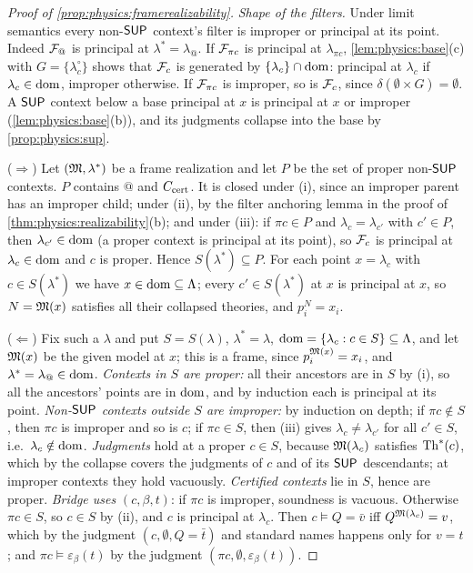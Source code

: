\begin{proof}[Proof of \cref{prop:physics:framerealizability}]
\emph{Shape of the filters.} Under limit semantics every non-$\mathsf{SUP}$ context's filter is
improper or principal at its point. Indeed $\mathcal{F}_@$ is principal at $\lambda^*=\lambda_@$. If
$\mathcal{F}_{\pi c}$ is principal at $\lambda_{\pi c}$, \cref{lem:physics:base}(c) with $G=\{\lambda^\circ_c\}$
shows that $\mathcal{F}_c$ is generated by $\{\lambda_c\}\cap\operatorname{dom}$: principal at $\lambda_c$ if
$\lambda_c\in\operatorname{dom}$, improper otherwise. If $\mathcal{F}_{\pi c}$ is improper, so is $\mathcal{F}_c$, since
$\delta(\emptyset\times G)=\emptyset$. A $\mathsf{SUP}$ context below a base principal at $x$ is
principal at $x$ or improper (\cref{lem:physics:base}(b)), and its judgments collapse into
the base by \cref{prop:physics:sup}.

($\Rightarrow$) Let $(\mathfrak{M},\lambda^*)$ be a frame realization and let $P$ be the set of
proper non-$\mathsf{SUP}$ contexts. $P$ contains $@$ and $C_{\mathrm{cert}}$. It is closed under (i), since an
improper parent has an improper child; under (ii), by the filter anchoring lemma in the
proof of \cref{thm:physics:realizability}(b); and under (iii): if $\pi c\in P$ and
$\lambda_c=\lambda_{c'}$ with $c'\in P$, then $\lambda_{c'}\in\operatorname{dom}$ (a proper context is
principal at its point), so $\mathcal{F}_c$ is principal at $\lambda_c\in\operatorname{dom}$ and $c$ is proper.
Hence $S(\lambda^*)\subseteq P$. For each point $x=\lambda_c$ with $c\in S(\lambda^*)$ we have
$x\in\operatorname{dom}\subseteq\Lambda$; every $c'\in S(\lambda^*)$ at $x$ is principal at $x$, so
$N=\mathfrak{M}(x)$ satisfies all their collapsed theories, and $p_i^N=x_i$.

($\Leftarrow$) Fix such a $\lambda$ and put $S=S(\lambda)$, $\lambda^*=\lambda$,
$\operatorname{dom}=\{\lambda_c:c\in S\}\subseteq\Lambda$, and let $\mathfrak{M}(x)$ be the given model at $x$; this
is a frame, since $p_i^{\mathfrak{M}(x)}=x_i$, and $\lambda^*=\lambda_@\in\operatorname{dom}$.
\emph{Contexts in $S$ are proper:} all their ancestors are in $S$ by (i), so all the
ancestors' points are in $\operatorname{dom}$, and by induction each is principal at its point.
\emph{Non-$\mathsf{SUP}$ contexts outside $S$ are improper:} by induction on depth; if
$\pi c\notin S$, then $\pi c$ is improper and so is $c$; if $\pi c\in S$, then (iii) gives
$\lambda_c\neq\lambda_{c'}$ for all $c'\in S$, i.e.\ $\lambda_c\notin\operatorname{dom}$.
\emph{Judgments} hold at a proper $c\in S$, because $\mathfrak{M}(\lambda_c)$ satisfies
$\mathrm{Th}^*(c)$, which by the collapse covers the judgments of $c$ and of its $\mathsf{SUP}$
descendants; at improper contexts they hold vacuously. \emph{Certified contexts} lie in
$S$, hence are proper. \emph{Bridge uses} $(c,\beta,t)$: if $\pi c$ is improper, soundness
is vacuous. Otherwise $\pi c\in S$, so $c\in S$ by (ii), and $c$ is principal at
$\lambda_c$. Then $c\models Q=\bar v$ iff $Q^{\mathfrak{M}(\lambda_c)}=v$, which by the judgment
$(c,\emptyset,Q=\bar t)$ and standard names happens only for $v=t$; and
$\pi c\models\varepsilon_\beta(t)$ by the judgment $(\pi c,\emptyset,\varepsilon_\beta(t))$.
\end{proof}

